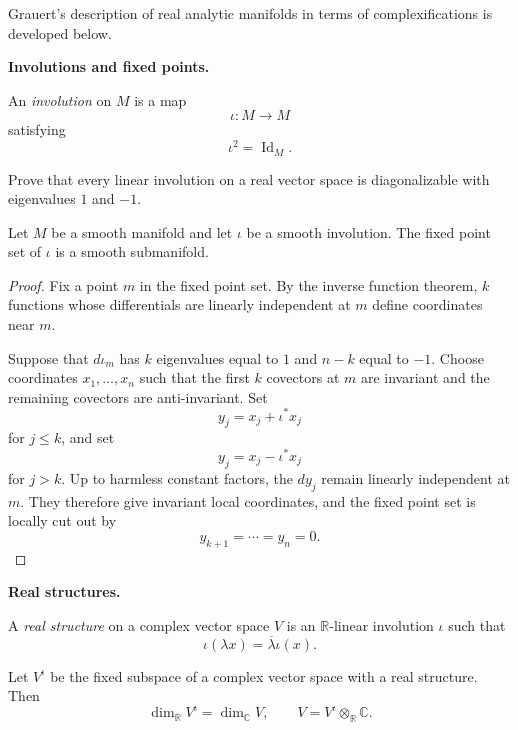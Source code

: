Grauert's description of real analytic
manifolds in terms of complexifications is
developed below.

\medskip\noindent
{\bf Involutions and fixed points.}

\begin{definition}
\label{definition-involution}
An {\it involution} on $M$ is a map
$$
\iota:M\longrightarrow M
$$
satisfying
$$
\iota^2=\operatorname{Id}_M.
$$
\end{definition}

\begin{exercise}
\label{exercise-linear-involution}
Prove that every linear involution on a real
vector space is diagonalizable with
eigenvalues $1$ and $-1$.
\end{exercise}

\begin{theorem}
\label{theorem-fixed-set-smooth}
Let $M$ be a smooth manifold and let $\iota$
be a smooth involution. The fixed point set
of $\iota$ is a smooth submanifold.
\end{theorem}

\begin{proof}
Fix a point $m$ in the fixed point set. By
the inverse function theorem, $k$ functions
whose differentials are linearly independent
at $m$ define coordinates near $m$.

Suppose that $d\iota_m$ has $k$
eigenvalues equal to $1$ and $n-k$ equal to
$-1$. Choose coordinates $x_1,\ldots,x_n$
such that the first $k$ covectors at $m$ are
invariant and the remaining covectors are
anti-invariant. Set
$$
y_j=x_j+\iota^*x_j
$$
for $j\leq k$, and set
$$
y_j=x_j-\iota^*x_j
$$
for $j>k$. Up to harmless constant factors,
the $dy_j$ remain linearly independent at
$m$. They therefore give invariant local
coordinates, and the fixed point set is
locally cut out by
$$
y_{k+1}=\cdots=y_n=0.
$$
\end{proof}

\medskip\noindent
{\bf Real structures.}

\begin{definition}
\label{definition-real-structure-vector}
A {\it real structure} on a complex vector
space $V$ is an $\mathbb{R}$-linear
involution $\iota$ such that
$$
\iota(\lambda x)
=\overline{\lambda}\iota(x).
$$
\end{definition}

\begin{proposition}
\label{proposition-fixed-real-form}
Let $V^\iota$ be the fixed subspace of a
complex vector space with a real structure.
Then
$$
\dim_{\mathbb{R}}V^\iota
=\dim_{\mathbb{C}}V,
\qquad
V=V^\iota\otimes_{\mathbb{R}}\mathbb{C}.
$$
\end{proposition}

